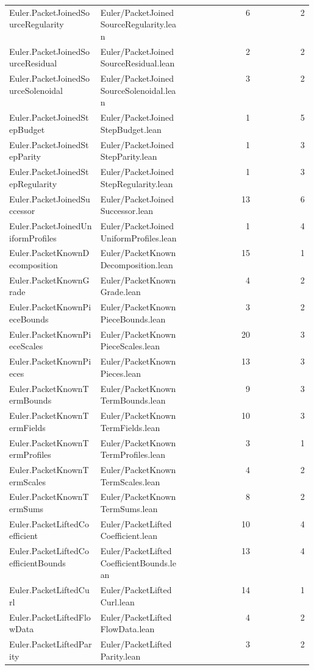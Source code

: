 \begin{longtable}{p{0.30\linewidth}p{0.28\linewidth}rr}
Euler.PacketJoinedSourceRegularity & Euler/PacketJoinedSourceRegularity.lean & 6 & 2\\
Euler.PacketJoinedSourceResidual & Euler/PacketJoinedSourceResidual.lean & 2 & 2\\
Euler.PacketJoinedSourceSolenoidal & Euler/PacketJoinedSourceSolenoidal.lean & 3 & 2\\
Euler.PacketJoinedStepBudget & Euler/PacketJoinedStepBudget.lean & 1 & 5\\
Euler.PacketJoinedStepParity & Euler/PacketJoinedStepParity.lean & 1 & 3\\
Euler.PacketJoinedStepRegularity & Euler/PacketJoinedStepRegularity.lean & 1 & 3\\
Euler.PacketJoinedSuccessor & Euler/PacketJoinedSuccessor.lean & 13 & 6\\
Euler.PacketJoinedUniformProfiles & Euler/PacketJoinedUniformProfiles.lean & 1 & 4\\
Euler.PacketKnownDecomposition & Euler/PacketKnownDecomposition.lean & 15 & 1\\
Euler.PacketKnownGrade & Euler/PacketKnownGrade.lean & 4 & 2\\
Euler.PacketKnownPieceBounds & Euler/PacketKnownPieceBounds.lean & 3 & 2\\
Euler.PacketKnownPieceScales & Euler/PacketKnownPieceScales.lean & 20 & 3\\
Euler.PacketKnownPieces & Euler/PacketKnownPieces.lean & 13 & 3\\
Euler.PacketKnownTermBounds & Euler/PacketKnownTermBounds.lean & 9 & 3\\
Euler.PacketKnownTermFields & Euler/PacketKnownTermFields.lean & 10 & 3\\
Euler.PacketKnownTermProfiles & Euler/PacketKnownTermProfiles.lean & 3 & 1\\
Euler.PacketKnownTermScales & Euler/PacketKnownTermScales.lean & 4 & 2\\
Euler.PacketKnownTermSums & Euler/PacketKnownTermSums.lean & 8 & 2\\
Euler.PacketLiftedCoefficient & Euler/PacketLiftedCoefficient.lean & 10 & 4\\
Euler.PacketLiftedCoefficientBounds & Euler/PacketLiftedCoefficientBounds.lean & 13 & 4\\
Euler.PacketLiftedCurl & Euler/PacketLiftedCurl.lean & 14 & 1\\
Euler.PacketLiftedFlowData & Euler/PacketLiftedFlowData.lean & 4 & 2\\
Euler.PacketLiftedParity & Euler/PacketLiftedParity.lean & 3 & 2\\

\end{longtable}
